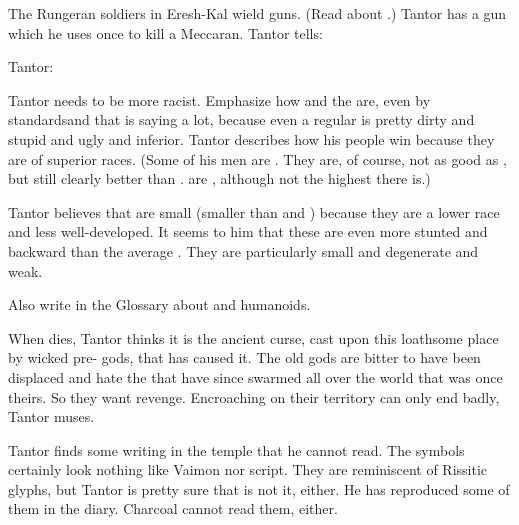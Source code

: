 \begin{changes}
    
    The Rungeran soldiers in Eresh-Kal wield guns. 
    (Read about .)
    Tantor has a gun which he uses once to kill a Meccaran.
    Tantor tells: 
    \begin{prose}
      Tantor: 
    \end{prose}
    
    Tantor needs to be more racist. 
    Emphasize how  and  the \EreshKali{} are, even by \meccaran{} standards\dash and that is saying a lot, because even a regular \meccaran{} is pretty dirty and stupid and ugly and inferior. 
    Tantor describes how his people win because they are of superior races. 
    (Some of his men are \scathae. 
     They are, of course, not as good as \humans, but still clearly better than \meccara.
     \Scathae{} are , although not the highest there is.)
    
    Tantor believes that \meccara are small (smaller than \humans and \scathae) because they are a lower race and less well-developed. 
    It seems to him that these \EreshKali are even more stunted and backward than the average \meccarans.
    They are particularly small and degenerate and weak. 
    
    Also write in the Glossary about  and  humanoids. 
    
    When \Mycah{} dies, Tantor thinks it is the ancient curse, cast upon this loathsome place by wicked pre-\human{} gods, that has caused it. 
    The old gods are bitter to have been displaced and hate the \humans{} that have since swarmed all over the world that was once theirs. 
    So they want revenge. 
    Encroaching on their territory can only end badly, Tantor muses. 
    
    Tantor finds some writing in the temple that he cannot read. 
    The symbols certainly look nothing like Vaimon nor \Ortaican{} script. 
    They are reminiscent of Rissitic glyphs, but Tantor is pretty sure that is not it, either. 
    He has reproduced some of them in the diary. 
    Charcoal cannot read them, either. 
    

\end{changes}
